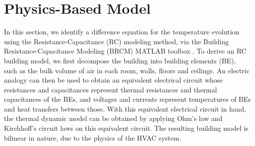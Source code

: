 
\section{Physics-Based Model} \label{sec:Physics_Based_Model}

In this section, we identify a difference equation for the temperature evolution using the Resistance-Capacitance (RC)  modeling method, via the Building Resistance-Capacitance Modeling (BRCM) MATLAB toolbox \cite{David}. 
To derive an RC building model, we first decompose the building into building elements (BE), such as the bulk volume of air in each room, walls, floors and ceilings. 
An electric analogy can then be used to obtain an equivalent electrical circuit whose resistances and capacitances represent thermal resistances and thermal capacitances of the BEs, and voltages and currents represent temperatures of BEs and heat transfers between those. 
With this equivalent electrical circuit in hand, the thermal dynamic model can be obtained by applying Ohm's law and Kirchhoff's circuit laws on this equivalent circuit.
The resulting building model is bilinear in nature, due to the physics of the HVAC system.




